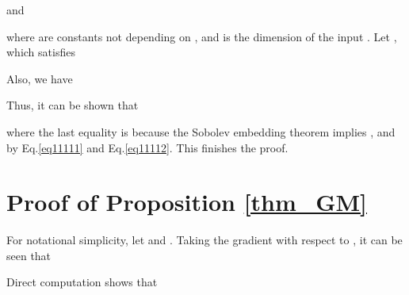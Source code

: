 \documentclass{article}
\theoremstyle{definition}
\begin{document}
and

where  are constants not depending on , and  is the dimension of the input . Let , which satisfies 

Also, we have

Thus, it can be shown that

where the last equality is because the Sobolev embedding theorem implies , and by Eq.\ref{eq11111} and Eq.\ref{eq11112}. This finishes the proof. 


\section{Proof of Proposition \ref{thm_GM}}
For notational simplicity, let  and . Taking the gradient with respect to , it can be seen that

Direct computation shows that
\end{document}
